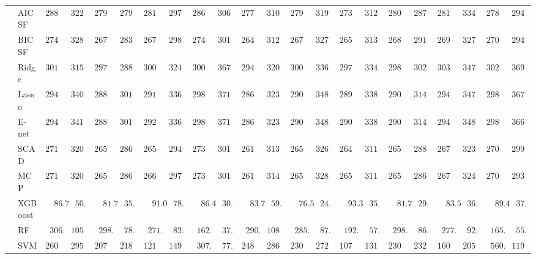 \begin{tabular}{ll|ll|llllll|llllll|llllll}
 & AIC SF  & $2881.26$ & $322.53$ & $2798.13$ & $279.99$ & $2813.50$ & $297.49$ & $2869.16$ & $306.34$ & $2777.65$ & $310.27$ & $2791.29$ & $319.99$ & $2735.92$ & $312.09$ & $2809.30$ & $287.09$ & $2817.92$ & $334.30$ & $2781.93$ & $294.26$ \\
 & BIC SF  & $2741.65$ & $328.84$ & $2676.45$ & $283.05$ & $2675.13$ & $298.38$ & $2742.98$ & $301.20$ & $2642.88$ & $312.36$ & $2672.34$ & $327.50$ & $2659.63$ & $313.67$ & $2681.58$ & $291.04$ & $2691.27$ & $327.32$ & $2706.51$ & $294.35$ \\
 & Ridge  & $3014.13$ & $315.25$ & $2974.47$ & $288.42$ & $3002.52$ & $324.26$ & $3003.64$ & $367.68$ & $2941.99$ & $320.14$ & $3002.37$ & $336.82$ & $2970.68$ & $334.82$ & $2984.44$ & $302.81$ & $3030.94$ & $347.15$ & $3029.35$ & $369.20$ \\
 & Lasso  & $2948.02$ & $340.05$ & $2880.77$ & $301.12$ & $2919.80$ & $336.71$ & $2980.10$ & $371.61$ & $2862.33$ & $323.79$ & $2902.47$ & $348.98$ & $2897.17$ & $338.67$ & $2903.12$ & $314.76$ & $2945.14$ & $347.24$ & $2980.34$ & $367.59$ \\
 & E-net  & $2948.68$ & $341.05$ & $2881.58$ & $301.38$ & $2923.27$ & $336.16$ & $2982.00$ & $371.96$ & $2865.23$ & $323.36$ & $2905.05$ & $348.92$ & $2900.42$ & $338.45$ & $2904.62$ & $314.65$ & $2945.49$ & $348.99$ & $2981.52$ & $366.49$ \\
 & SCAD  & $2715.42$ & $320.52$ & $2650.57$ & $286.40$ & $2657.41$ & $294.00$ & $2739.77$ & $301.19$ & $2616.41$ & $313.87$ & $2654.97$ & $326.98$ & $2648.89$ & $311.63$ & $2657.96$ & $288.24$ & $2677.46$ & $323.74$ & $2706.97$ & $299.01$ \\
 & MCP  & $2717.49$ & $320.67$ & $2651.74$ & $286.47$ & $2664.17$ & $297.22$ & $2736.35$ & $301.80$ & $2618.05$ & $314.26$ & $2655.17$ & $328.15$ & $2651.73$ & $311.48$ & $2658.32$ & $286.46$ & $2678.35$ & $324.37$ & $2705.90$ & $293.68$ \\
 & XGBoost  & $\phantom{00}86.76$ & $\phantom{0}50.53$ & $\phantom{00}81.76$ & $\phantom{0}35.39$ & $\phantom{00}91.07$ & $\phantom{0}78.31$ & $\phantom{00}86.49$ & $\phantom{0}30.68$ & $\phantom{00}83.74$ & $\phantom{0}59.81$ & $\phantom{00}76.51$ & $\phantom{0}24.18$ & $\phantom{00}93.31$ & $\phantom{0}35.71$ & $\phantom{00}81.76$ & $\phantom{0}29.35$ & $\phantom{00}83.54$ & $\phantom{0}36.71$ & $\phantom{00}89.46$ & $\phantom{0}37.10$ \\
 & RF  & $\phantom{0}306.17$ & $105.81$ & $\phantom{0}298.50$ & $\phantom{0}78.07$ & $\phantom{0}271.23$ & $\phantom{0}82.44$ & $\phantom{0}162.33$ & $\phantom{0}37.69$ & $\phantom{0}290.58$ & $108.90$ & $\phantom{0}285.74$ & $\phantom{0}87.24$ & $\phantom{0}192.32$ & $\phantom{0}57.14$ & $\phantom{0}298.37$ & $\phantom{0}86.95$ & $\phantom{0}277.48$ & $\phantom{0}92.79$ & $\phantom{0}165.87$ & $\phantom{0}55.72$ \\
 & SVM  & $2601.43$ & $295.17$ & $2079.75$ & $218.16$ & $1213.69$ & $149.53$ & $\phantom{0}307.80$ & $\phantom{0}77.48$ & $2486.14$ & $286.19$ & $2301.70$ & $272.27$ & $1078.37$ & $131.64$ & $2300.82$ & $232.77$ & $1605.57$ & $205.31$ & $\phantom{0}560.56$ & $119.93$ \\
\hline 
\end{tabular}


